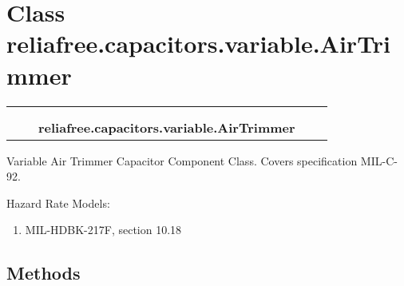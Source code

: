 %
%
%


\section{Class reliafree.capacitors.variable.AirTrimmer}

    \label{reliafree:capacitors:variable:AirTrimmer}
\begin{tabular}{cccccc}
\multicolumn{2}{r}{\settowidth{\BCL}{reliafree.capacitors.capacitor.Capacitor}\multirow{2}{\BCL}{reliafree.capacitors.capacitor.Capacitor}}
&&
  \\\cline{3-3}
  &&\multicolumn{1}{c|}{}
&&
  \\
&&\multicolumn{2}{l}{\textbf{reliafree.capacitors.variable.AirTrimmer}}
\end{tabular}

Variable Air Trimmer Capacitor Component Class. Covers specification 
MIL-C-92.

Hazard Rate Models:

\begin{enumerate}

\setlength{\parskip}{0.5ex}
  \item MIL-HDBK-217F, section 10.18

\end{enumerate}



  \subsection{Methods}

    \vspace{0.5ex}

